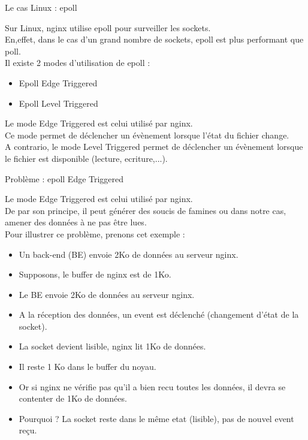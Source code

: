 \documentclass[aspectratio=43,8pt]{beamer}
\begin{document}
\begin{frame}{Le cas Linux : epoll}
\begin{card}
	Sur Linux, nginx utilise epoll pour surveiller les sockets.\\
	En,effet, dans le cas d'un grand nombre de sockets, epoll est plus performant que poll.\\
	Il existe 2 modes d'utilisation de epoll :
	\begin{itemize}
		\item   Epoll Edge Triggered
		\item   Epoll Level Triggered
	\end{itemize}
	Le mode Edge Triggered est celui utilisé par nginx.\\
	Ce mode permet de déclencher un évènement lorsque l'état du fichier change.\\
	A contrario, le mode Level Triggered permet de déclencher un évènement lorsque le fichier est disponible (lecture, ecriture,...).\\
\end{card}
\end{frame}

\begin{frame}{Problème : epoll Edge Triggered}
\begin{card}
	Le mode Edge Triggered est celui utilisé par nginx.\\
	De par son principe, il peut générer des soucis de famines ou dans notre cas, amener des données à ne pas être lues. \\
	Pour illustrer ce problème, prenons cet exemple :
	\begin{itemize}
		\item   Un back-end (BE) envoie 2Ko de données au serveur nginx.
		\item   Supposons, le buffer de nginx est de 1Ko.
		\item   Le BE envoie 2Ko de données au serveur nginx.
		\item 	A la réception des données, un event est déclenché (changement d'état de  la socket).
		\item   La socket devient lisible, nginx lit 1Ko de données.
		\item 	Il reste 1 Ko dans le buffer du noyau.
		\item   Or si nginx ne vérifie pas qu'il a bien recu toutes les données, il devra se contenter de 1Ko de données.
		\item   Pourquoi ? La socket reste dans le même etat (lisible), pas de nouvel event reçu.
	\end{itemize}
\end{card}
\end{frame}
\end{document}
